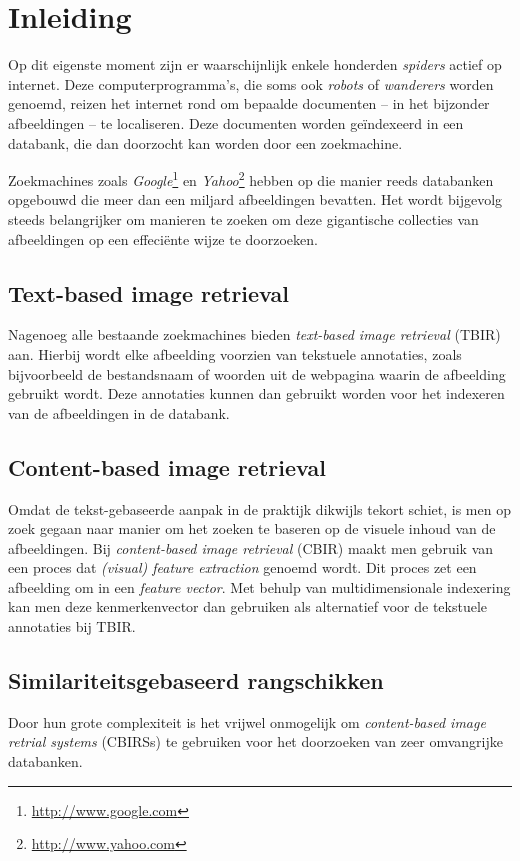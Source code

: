 \chapter{Inleiding}

Op dit eigenste moment zijn er waarschijnlijk enkele honderden \emph{spiders} actief op internet.
Deze computerprogramma's, die soms ook \emph{robots} of \emph{wanderers} worden genoemd, reizen
het internet rond om bepaalde documenten -- in het bijzonder afbeeldingen -- te localiseren. Deze 
documenten worden ge\"indexeerd in een databank, die dan doorzocht kan worden door een zoekmachine. 

Zoekmachines zoals \emph{Google}\footnote{\url{http://www.google.com}} en 
\emph{Yahoo}\footnote{\url{http://www.yahoo.com}} hebben op die manier reeds databanken
opgebouwd die meer dan een miljard afbeeldingen bevatten. Het wordt bijgevolg steeds belangrijker
om manieren te zoeken om deze gigantische collecties van afbeeldingen op een effeci\"ente wijze
te doorzoeken.


\section{Text-based image retrieval}

Nagenoeg alle bestaande zoekmachines bieden \emph{text-based image retrieval} (TBIR) aan. Hierbij
wordt elke afbeelding voorzien van tekstuele annotaties, zoals bijvoorbeeld de 
bestandsnaam of woorden uit de webpagina waarin de afbeelding gebruikt wordt. Deze annotaties
kunnen dan gebruikt worden voor het indexeren van de afbeeldingen in de databank.


\section{Content-based image retrieval}

Omdat de tekst-gebaseerde aanpak in de praktijk dikwijls tekort schiet, is men op zoek gegaan 
naar manier om het zoeken te baseren op de visuele inhoud van de afbeeldingen. Bij 
\emph{content-based image retrieval} (CBIR) maakt men gebruik van een proces dat 
\emph{(visual) feature extraction} genoemd wordt. Dit proces zet een afbeelding om in een 
\emph{feature vector}. Met behulp van multidimensionale indexering kan men deze kenmerkenvector
dan gebruiken als alternatief voor de tekstuele annotaties bij TBIR.


\section{Similariteitsgebaseerd rangschikken}

Door hun grote complexiteit is het vrijwel onmogelijk om \emph{content-based image retrial systems} 
(CBIRSs) te gebruiken voor het doorzoeken van zeer omvangrijke databanken. 